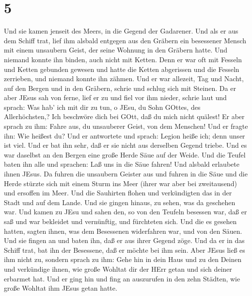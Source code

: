 \hypertarget{section-4}{%
\section{5}\label{section-4}}

 Und sie kamen jenseit des Meers, in die Gegend der
Gadarener.  Und als er aus dem Schiff trat, lief ihm alsbald
entgegen aus den Gräbern ein besessener Mensch mit einem unsaubern
Geist,  der seine Wohnung in den Gräbern hatte. Und niemand
konnte ihn binden, auch nicht mit Ketten.  Denn er war oft
mit Fesseln und Ketten gebunden gewesen und hatte die Ketten abgerissen
und die Fesseln zerrieben, und niemand konnte ihn zähmen. 
Und er war allezeit, Tag und Nacht, auf den Bergen und in den Gräbern,
schrie und schlug sich mit Steinen.  Da er aber JEsus sah
von ferne, lief er zu und fiel vor ihm nieder, schrie laut und sprach:
 Was hab' ich mit dir zu tun, o JEsu, du Sohn GOttes, des
Allerhöchsten,? Ich beschwöre dich bei GOtt, daß du mich nicht quälest!
 Er aber sprach zu ihm: Fahre aus, du unsauberer Geist, von
dem Menschen!  Und er fragte ihn: Wie heißest du? Und er
antwortete und sprach: Legion heiße ich; denn unser ist viel.
 Und er bat ihn sehr, daß er sie nicht aus derselben Gegend
triebe.  Und es war daselbst an den Bergen eine große Herde
Säue auf der Weide.  Und die Teufel baten ihn alle und
sprachen: Laß uns in die Säue fahren!  Und alsbald
erlaubete ihnen JEsus. Da fuhren die unsaubern Geister aus und fuhren in
die Säue und die Herde stürzte sich mit einem Sturm ins Meer (ihrer war
aber bei zweitausend) und ersoffen im Meer.  Und die
Sauhirten flohen und verkündigten das in der Stadt und auf dem Lande.
Und sie gingen hinaus, zu sehen, was da geschehen war.  Und
kamen zu JEsu und sahen den, so von den Teufeln besessen war, daß er saß
und war bekleidet und vernünftig, und fürchteten sich.  Und
die es gesehen hatten, sagten ihnen, was dem Besessenen widerfahren war,
und von den Säuen.  Und sie fingen an und baten ihn, daß er
aus ihrer Gegend zöge.  Und da er in das Schiff trat, bat
ihn der Besessene, daß er möchte bei ihm sein.  Aber JEsus
ließ es ihm nicht zu, sondern sprach zu ihm: Gehe hin in dein Haus und
zu den Deinen und verkündige ihnen, wie große Wohltat dir der HErr getan
und sich deiner erbarmet hat.  Und er ging hin und fing an
auszurufen in den zehn Städten, wie große Wohltat ihm JEsus getan hatte.
